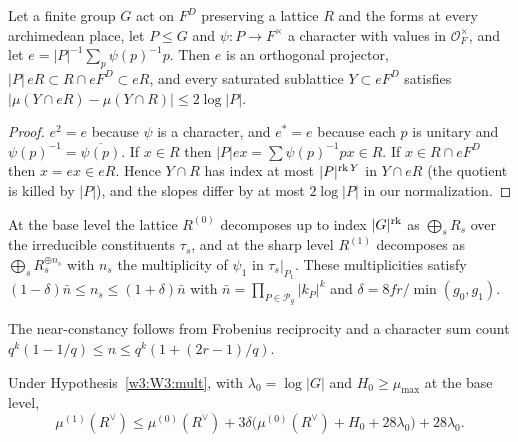 \begin{lemma}[projectors]\label{w3:W3:proj}
Let a finite group $G$ act on $F^D$ preserving a lattice $R$ and the forms at every archimedean place, let $P\le G$ and $\psi\colon P\to F^\times$ a character with values in $\mathcal O_F^\times$, and let $e=\lvert P\rvert^{-1}\sum_{p}\psi(p)^{-1}p$. Then $e$ is an orthogonal projector, $\lvert P\rvert\,eR\subset R\cap eF^D\subset eR$, and every saturated sublattice $Y\subset eF^D$ satisfies $\lvert\mu(Y\cap eR)-\mu(Y\cap R)\rvert\le2\log\lvert P\rvert$.
\end{lemma}

\begin{proof}
$e^2=e$ because $\psi$ is a character, and $e^*=e$ because each $p$ is unitary and $\psi(p)^{-1}=\overline{\psi(p)}$. If $x\in R$ then $\lvert P\rvert ex=\sum\psi(p)^{-1}px\in R$. If $x\in R\cap eF^D$ then $x=ex\in eR$. Hence $Y\cap R$ has index at most $\lvert P\rvert^{\operatorname{rk} Y}$ in $Y\cap eR$ (the quotient is killed by $\lvert P\rvert$), and the slopes differ by at most $2\log\lvert P\rvert$ in our normalization.
\end{proof}

\begin{hypothesis}\label{w3:W3:mult}
At the base level the lattice $R^{(0)}$ decomposes up to index $\lvert G\rvert^{\operatorname{rk}}$ as $\bigoplus_sR_s$ over the irreducible constituents $\tau_s$, and at the sharp level $R^{(1)}$ decomposes as $\bigoplus_sR_s^{\oplus n_s}$ with $n_s$ the multiplicity of $\psi_1$ in $\tau_s|_{P_1}$. These multiplicities satisfy $(1-\delta)\bar n\le n_s\le(1+\delta)\bar n$ with $\bar n=\prod_{P\in\mathcal P_g}\lvert k_P\rvert^k$ and $\delta=8fr/\min(g_0,g_1)$.
\end{hypothesis}

The near-constancy follows from Frobenius reciprocity and a character sum count $q^k(1-1/q)\le n\le q^k(1+(2r-1)/q)$. 

\begin{proposition}[passage]\label{w3:W3:passage}
Under Hypothesis~\ref{w3:W3:mult}, with $\lambda_0=\log\lvert G\rvert$ and $H_0\ge\mu_{\max}$ at the base level,
\[
\mu^{(1)}(R^\vee)\le\mu^{(0)}(R^\vee)+3\delta\big(\mu^{(0)}(R^\vee)+H_0+28\lambda_0\big)+28\lambda_0 .
\]
\end{proposition}

